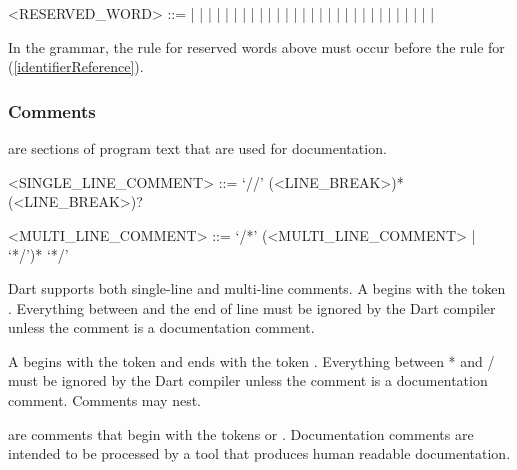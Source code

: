 \documentclass[makeidx]{article}
\begin{document}
{\begin{grammar}
<RESERVED\_WORD> ::= \ASSERT{} | \BREAK{} | \CASE{} | \CATCH{} |
    \CLASS{} | \CONST{}
  \alt\hspace{-3mm} \CONTINUE{} | \DEFAULT{} | \DO{} | \ELSE{} | \ENUM{} |
    \EXTENDS{} | \FALSE{} | \FINAL{} | \FINALLY{} | \FOR{}
  \alt\hspace{-3mm} \IF{} | \IN{} | \IS{} | \NEW{} | \NULL{} | \RETHROW{} |
    \RETURN{} | \SUPER{} | \SWITCH{} | \THIS{} | \THROW{}
  \alt\hspace{-3mm} \TRUE{} | \TRY{} | \VAR{} | \VOID{} | \WHILE{} | \WITH{}
\end{grammar}

\LMHash{}%
In the grammar, the rule for reserved words above must occur
before the rule for 
(\ref{identifierReference}).



\subsubsection{Comments}

\LMHash{}%
are sections of program text that are used for documentation.

\begin{grammar}
<SINGLE\_LINE\_COMMENT> ::= \gnewline{}
  `//' \gtilde(<LINE\_BREAK>)* (<LINE\_BREAK>)?

<MULTI\_LINE\_COMMENT> ::= \gnewline{}
  `/*' (<MULTI\_LINE\_COMMENT> | \gtilde{} `*/')* `*/'
\end{grammar}

\LMHash{}%
Dart supports both single-line and multi-line comments.
A  begins with the token \code{//}.
Everything between \code{//} and the end of line
must be ignored by the Dart compiler
unless the comment is a documentation comment.

\LMHash{}%
A  begins with the token \code{/*}
and ends with the token \code{*/}.
Everything between \code{/}* and \code{*}/
must be ignored by the Dart compiler
unless the comment is a documentation comment.
Comments may nest.

\LMHash{}%
are comments that begin with the tokens \code{///} or \code{/**}.
Documentation comments are intended to be processed by
a tool that produces human readable documentation.

}
\end{document}
